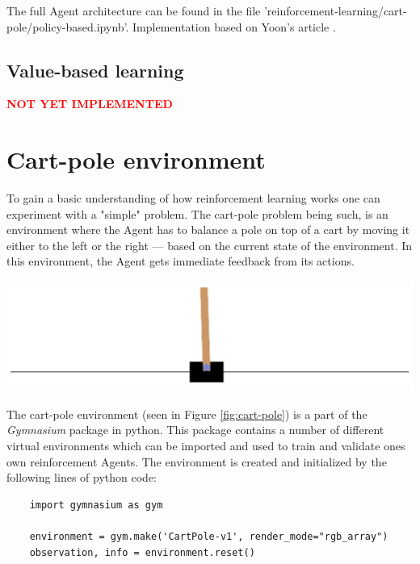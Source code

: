 \documentclass{article}
\renewenvironment{leftbar}[1][\hsize]{
    \def\FrameCommand{{\color{barcolor}\vrule width 2pt \hspace{10pt}}}
    \MakeFramed{\hsize#1 \advance\hsize-\width \FrameRestore}
}{\endMakeFramed}
\begin{document}
The full Agent architecture can be found in the file 'reinforcement-learning/cart-pole/policy-based.ipynb'. Implementation based on Yoon's article \cite{REINFORCE}.
\subsection*{Value-based learning}
\begin{leftbar}
    \textbf{\textcolor{red}{NOT YET IMPLEMENTED}}
\end{leftbar}

\section*{Cart-pole environment}

\begin{minipage}{.5\textwidth}
  To gain a basic understanding of how reinforcement learning works one can experiment with a "simple" problem. The cart-pole problem being such, is an environment where the Agent has to balance a pole on top of a cart by moving it either to the left or the right — based on the current state of the environment. In this environment, the Agent gets immediate feedback from its actions.
\end{minipage}%
\begin{minipage}{.5\textwidth}
    \centering
    \includegraphics[width=.8\linewidth]{images/cart-pole.png}
    \label{fig:cart-pole}
\end{minipage}

\vspace{0.2cm}

The cart-pole environment (seen in Figure \ref{fig:cart-pole}) is a part of the \textit{Gymnasium} package in python. This package contains a number of different virtual environments which can be imported and used to train and validate ones own reinforcement Agents. \cite{Gymnasium} \cite{Cart-pole} The environment is created and initialized by the following lines of python code:

\vspace{0.2cm}

\begin{lstlisting}
    import gymnasium as gym
    
    environment = gym.make('CartPole-v1', render_mode="rgb_array")
    observation, info = environment.reset()
\end{lstlisting}
\end{document}

